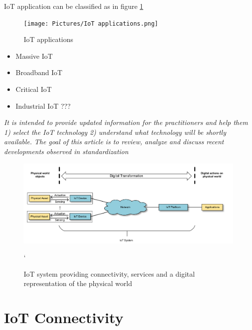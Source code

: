 \documentclass[conference]{IEEEtran}
\begin{document}
IoT application can be classified as in figure \ref{fig:IoT_applications}

\begin{figure}
\centerline{\texttt{[image: Pictures/IoT applications.png]}}
\caption{IoT applications}
\label{fig:IoT_applications}
\end{figure}


\begin{itemize}
    \item   Massive IoT
    \item   Broadband IoT
    \item   Critical IoT
    \item   Industrial IoT ???
\end{itemize}


\emph{It is intended to provide updated information for the practitioners and help them 1) select the IoT technology 2) understand what technology will be shortly available. The goal of this article is to review, analyze and discuss recent developments observed in standardization }

\begin{figure}
\centerline{\includegraphics[width=\linewidth]{Pictures/IoT system providing connectivity, services and a digital representation of the physical world.png}}
\caption{IoT system providing connectivity, services and a digital representation of the physical world}`
\label{fig:IoT_sys-ex}
\end{figure}







\section{IoT Connectivity}
\label{sec:2-IoT-Connectivity}


\end{document}
